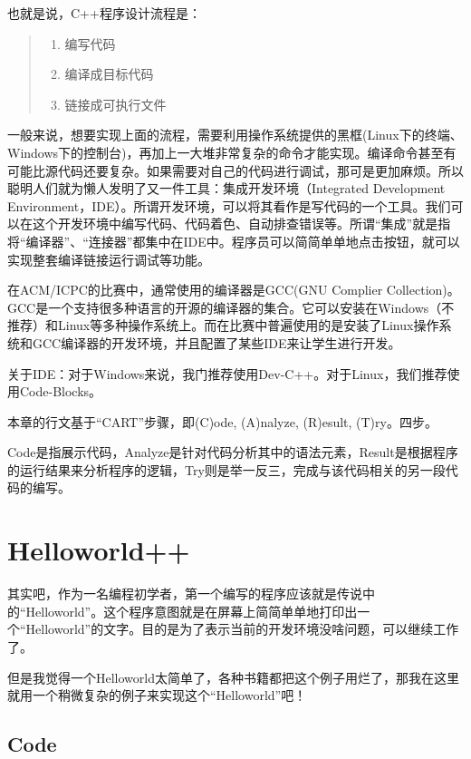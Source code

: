 也就是说，C++程序设计流程是：
\begin{quote}
	\begin{enumerate}
		\item 编写代码
		\item 编译成目标代码
		\item 链接成可执行文件
	\end{enumerate}
\end{quote}


一般来说，想要实现上面的流程，需要利用操作系统提供的黑框(Linux下的终端、Windows下的控制台)，再加上一大堆非常复杂的命令才能实现。编译命令甚至有可能比源代码还要复杂。如果需要对自己的代码进行调试，那可是更加麻烦。所以聪明人们就为懒人发明了又一件工具：集成开发环境（Integrated Development Environment，IDE）。所谓开发环境，可以将其看作是写代码的一个工具。我们可以在这个开发环境中编写代码、代码着色、自动排查错误等。所谓“集成”就是指将“编译器”、“连接器”都集中在IDE中。程序员可以简简单单地点击按钮，就可以实现整套编译链接运行调试等功能。

在ACM/ICPC的比赛中，通常使用的编译器是GCC(GNU Complier Collection)。GCC是一个支持很多种语言的开源的编译器的集合。它可以安装在Windows（不推荐）和Linux等多种操作系统上。而在比赛中普遍使用的是安装了Linux操作系统和GCC编译器的开发环境，并且配置了某些IDE来让学生进行开发。

关于IDE：对于Windows来说，我门推荐使用Dev-C++。对于Linux，我们推荐使用Code-Blocks。

本章的行文基于“CART”步骤，即(C)ode, (A)nalyze, (R)esult, (T)ry。四步。

Code是指展示代码，Analyze是针对代码分析其中的语法元素，Result是根据程序的运行结果来分析程序的逻辑，Try则是举一反三，完成与该代码相关的另一段代码的编写。

\section{Helloworld++}
其实吧，作为一名编程初学者，第一个编写的程序应该就是传说中的“Helloworld”。这个程序意图就是在屏幕上简简单单地打印出一个“Helloworld”的文字。目的是为了表示当前的开发环境没啥问题，可以继续工作了。

但是我觉得一个Helloworld太简单了，各种书籍都把这个例子用烂了，那我在这里就用一个稍微复杂的例子来实现这个“Helloworld”吧！

\subsection{Code}


